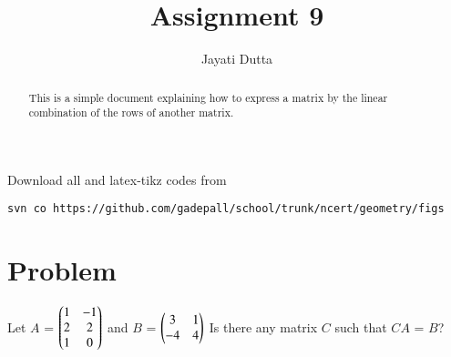 \documentclass[journal,12pt,twocolumn]{IEEEtran}
\begin{document}
\let\StandardTheFigure\thefigure
\let\vec\mathbf
\renewcommand{\thefigure}{\theproblem}



\def\putbox#1#2#3{\makebox[0in][l]{\makebox[#1][l]{}\raisebox{\baselineskip}[0in][0in]{\raisebox{#2}[0in][0in]{#3}}}}
     \def\rightbox#1{\makebox[0in][r]{#1}}
     \def\centbox#1{\makebox[0in]{#1}}
     \def\topbox#1{\raisebox{-\baselineskip}[0in][0in]{#1}}
     \def\midbox#1{\raisebox{-0.5\baselineskip}[0in][0in]{#1}}

\vspace{3cm}


\title{Assignment 9}
\author{Jayati Dutta}





\maketitle

\newpage


\bigskip

\renewcommand{\thefigure}{\theenumi}
\renewcommand{\thetable}{\theenumi}


\begin{abstract}
This is a simple document explaining how to express a matrix by the linear combination of the rows of another matrix.
\end{abstract}

%

Download all and latex-tikz codes from 
%
\begin{lstlisting}
svn co https://github.com/gadepall/school/trunk/ncert/geometry/figs
\end{lstlisting}
%


\section{Problem}
Let $A$ = $\begin{pmatrix}1 & -1\\2 & 2\\1 & 0\end{pmatrix}$ and $B$ = $\begin{pmatrix}3 & 1\\-4 & 4\end{pmatrix}$
Is there any matrix $C$ such that $CA$ = $B$?
\end{document}
